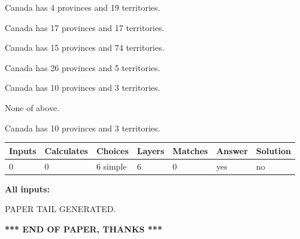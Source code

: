 \documentclass[12pt]{article}
\begin{document}
 
Canada has   4 provinces and  19 territories.
 
 
Canada has  17 provinces and  17 territories.
 
 
Canada has  15 provinces and  74 territories.
 
 
Canada has  26 provinces and  5 territories.
 
 
Canada has 10  provinces and 3 territories.
 
 
 None of above.
 
 
\noindent{}
 
 
Canada has 10  provinces and 3 territories.
 
 
\noindent{}
 
 
   
   
   
   
\noindent\begin{tabular}{|l|l|l|l|l|l|l|}
 \hline
Inputs & Calculates & Choices & Layers & Matches & Answer & Solution \\ \hline
 0  & 
 0  & 
 6
  simple  
  & 
 6  & 
 0  & 
  yes & 
  no 
  \\ \hline
 \end{tabular}
   
   
   
   
\noindent{}
   
   
   
   
\noindent\vspace{0.1in}\hspace{-0.08in} {\textbf{\Large{All inputs: }}}
   
   
   
   
   
   
 \vspace{0.2in}
 
   
   
\vspace{2.0in} PAPER TAIL GENERATED.
   
   
   
   
\vspace{1.0in} 
{\textbf{\large{ *** END OF PAPER, THANKS *** }}} 
   
\end{document}
